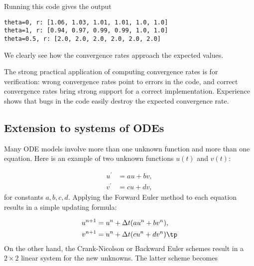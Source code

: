 \documentclass[graybox,sectrefs,envcountresetchap,open=right,final]{svmonodo}
\newenvironment{notice_mdfboxadmon}[1][]{
\begin{notice_mdfboxmdframed}[frametitle=#1]
}
{
\end{notice_mdfboxmdframed}
}
\begin{document}
Running this code gives the output

\begin{Verbatim}[frame=lines,label=\fbox{{\tiny Terminal}},framesep=2.5mm,framerule=0.7pt,fontsize=\fontsize{9pt}{9pt}]
theta=0, r: [1.06, 1.03, 1.01, 1.01, 1.0, 1.0]
theta=1, r: [0.94, 0.97, 0.99, 0.99, 1.0, 1.0]
theta=0.5, r: [2.0, 2.0, 2.0, 2.0, 2.0, 2.0]
\end{Verbatim}
We clearly see how the convergence rates approach the expected values.



\begin{notice_mdfboxadmon}
The strong practical application of computing convergence rates is for
verification: wrong convergence rates point to errors in the code, and
correct convergence rates bring strong support for a correct implementation.
Experience shows that bugs in the code easily destroy the
expected convergence rate.
\end{notice_mdfboxadmon}





\subsection{Extension to systems of ODEs}

Many ODE models involve more than one unknown function and more
than one equation. Here is an example of two unknown functions $u(t)$
and $v(t)$:

\begin{align}
u^{\prime} &= a u + bv,\\ 
v^{\prime} &= cu +  dv,
\end{align}
for constants $a,b,c,d$.
Applying the Forward Euler method to each equation results in a simple
updating formula:

\begin{align}
u^{n+1} &= u^n + \Delta t (a u^n + b v^n),\\ 
v^{n+1} &= u^n + \Delta t (cu^n + dv^n)
\tp
\end{align}
On the other hand, the Crank-Nicolson or Backward Euler schemes result in a
$2\times 2$ linear system for the new unknowns. The latter scheme becomes
\end{document}
